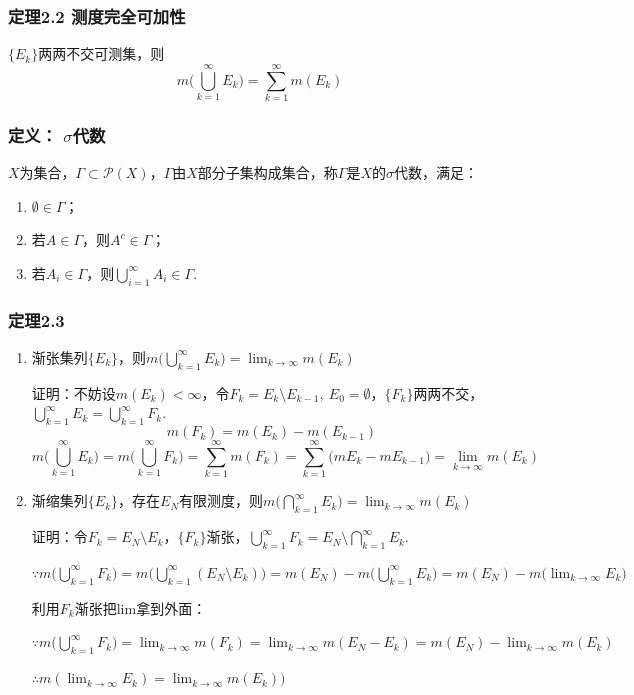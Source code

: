 \documentclass{article}
\begin{document}
	\subsubsection{定理2.2 测度完全可加性}
	$\{E_k\}$两两不交可测集，则
	\[
	\displaystyle m\Big(\bigcup_{k=1}^{\infty}E_k\Big)=\sum_{k=1}^{\infty}m(E_k)
	\]
	
	\subsubsection{定义： $\sigma$代数}
	$X$为集合，$\Gamma \subset\mathscr{P}(X)$，$\Gamma $由$X$部分子集构成集合，称$\Gamma $是$X$的$\sigma$代数，满足：
	\begin{enumerate}
		\item $\emptyset\in\Gamma $；
		\item 若$A\in\Gamma $，则$A^c\in\Gamma $；
		\item 若$A_i\in\Gamma $，则$\bigcup\limits_{i=1}^{\infty}A_i\in\Gamma $.
	\end{enumerate}
	
	\subsubsection{定理2.3}
	\begin{enumerate}
		\item 渐张集列$\{E_k\}$，则$\displaystyle 
		m\Big(\bigcup_{k=1}^{\infty}E_k\Big)=\lim_{k\to\infty}m(E_k)
		$
		
		证明：不妨设$m(E_k)<\infty$，令$F_k=E_k\setminus E_{k-1},\ E_0=\emptyset$，$\{F_k\}$两两不交，$\bigcup\limits_{k=1}^{\infty}E_k=\bigcup\limits_{k=1}^{\infty}F_k$.
		\[
		m(F_k)=m(E_k)-m(E_{k-1})
		\]
		\[
		m\Big(\bigcup_{k=1}^{\infty}E_k\Big)=m\Big(\bigcup_{k=1}^{\infty}F_k\Big)=\sum_{k=1}^{\infty}m(F_k)=\sum_{k=1}^{\infty}\big(mE_k-mE_{k-1}\big)=\lim_{k\to\infty}m(E_k)
		\]
		\item 渐缩集列$\{E_k\}$，存在$E_N$有限测度，则$\displaystyle 
		m\Big(\bigcap_{k=1}^{\infty}E_k\Big)=\lim_{k\to\infty}m(E_k)
		$
		
		证明：令$F_k=E_N\setminus E_k$，$\{F_k\}$渐张，$\bigcup\limits_{k=1}^{\infty}F_k=E_N\setminus\bigcap\limits_{k=1}^{\infty}E_k$.
		
		$\displaystyle \because m\Big(\bigcup_{k=1}^{\infty} F_k \Big)=m\Big(\bigcup_{k=1}^{\infty} (E_N \setminus E_k)\Big)=m(E_N) - m\Big(\bigcup_{k=1}^{\infty} E_k \Big)=m(E_N) - m\Big(\lim_{k\to \infty} E_k \Big)$
		
		利用$F_k$渐张把lim拿到外面：
		
		$\displaystyle \because m\Big(\bigcup_{k=1}^{\infty} F_k \Big)=\lim_{k\to \infty} m(F_k)=\lim_{k\to \infty} m( E_N-E_k )=m(E_N)-\lim_{k\to \infty}m(E_k)$
		
		$\displaystyle \therefore m(\lim_{k\to \infty}E_k)=\lim_{k\to \infty}m(E_k))$
	\end{enumerate}
	
\end{document}
